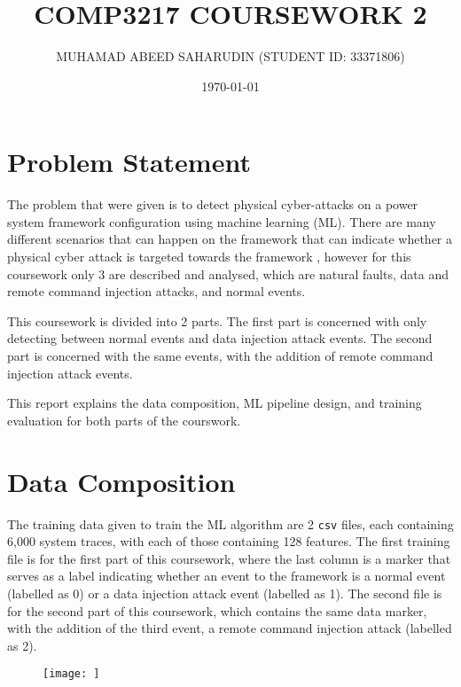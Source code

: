 \documentclass[12pt]{article}
\title{COMP3217 COURSEWORK 2}
\author{MUHAMAD ABEED SAHARUDIN (STUDENT ID: 33371806)}
\date{\today}
\begin{document}
    \maketitle

    \section{Problem Statement}

        The problem that were given is to detect physical cyber-attacks on a power system framework configuration using 
        machine learning (ML). There are many different scenarios that can happen on the framework that can indicate
        whether a physical cyber attack is targeted towards the framework \cite{cw-readme}, however for this coursework 
        only 3 are described and analysed, which are natural faults, data and remote command injection attacks, and
        normal events.

        This coursework is divided into 2 parts. The first part is concerned with only detecting between normal events 
        and data injection attack events. The second part is concerned with the same events, with the addition of 
        remote command injection attack events.
        
        This report explains the data composition, ML pipeline design, and training evaluation for both
        parts of the courswork.

    \section{Data Composition}

        The training data given to train the ML algorithm are 2 \verb|csv| files, each containing 6,000  system traces, 
        with each of those containing 128 features. The first training file is for the first part of this coursework, 
        where the last column is a marker that serves as a label indicating whether an event to the framework is a 
        normal event (labelled as 0) or a data injection attack event (labelled as 1). The second file is for the
        second part of this coursework, which contains the same data marker, with the addition of the third event, a 
        remote command injection attack (labelled as 2).

        
        \begin{figure}[h]
            \centering
            \texttt{[image: ]}
        \end{figure}
\end{document}

